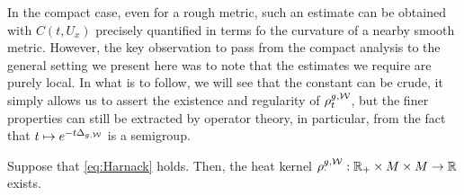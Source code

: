 \documentclass[a4paper, 12pt]{amsart}
\begin{document}
In the compact case, even for a
rough metric, such an estimate can be
obtained with $C(t,U_x)$ precisely quantified
in terms fo the curvature of a nearby smooth metric.
However, the key observation to pass from the compact analysis
to the general setting we present here was to note that
the estimates we require are purely local. In 
what is to follow, we will see that the constant can be
crude, it simply allows us to assert the existence and regularity
of $\rho^{g,\mathcal{W}}_t$, but the finer properties can still 
be extracted by operator theory, in particular, from the 
fact that $t \mapsto e^{-t\Delta_{g,\mathcal{W}}}$ is a semigroup.

\begin{prop}
\label{Prop:MainRed}
Suppose that \eqref{eq:Harnack} holds. Then, the heat
kernel $\rho^{g,\mathcal{W}}_{\cdotp}: \mathbb{R}_{+} \times M \times M \to \mathbb{R}$
exists.
\end{prop} 
\end{document}
